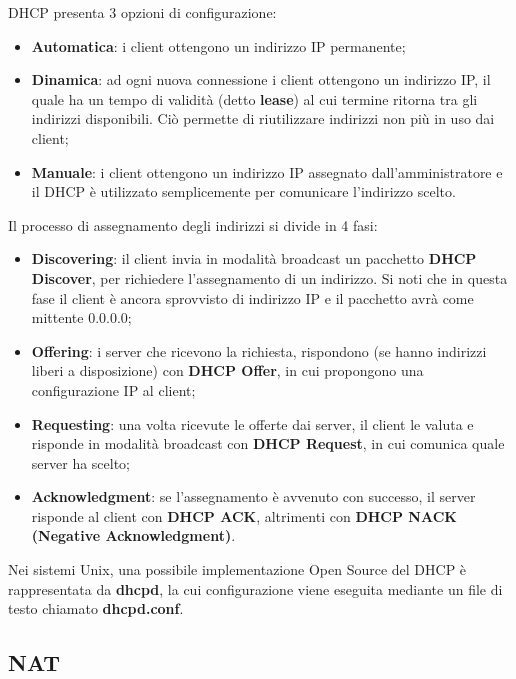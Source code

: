         DHCP presenta 3 opzioni di configurazione:

        \begin{itemize}
            \item \textbf{Automatica}: i client ottengono un indirizzo IP permanente;
            \item \textbf{Dinamica}: ad ogni nuova connessione i client ottengono un indirizzo IP, il quale ha un
            tempo di validità (detto \textbf{lease}) al cui termine ritorna tra gli indirizzi disponibili. Ciò
            permette di riutilizzare indirizzi non più in uso dai client;
            \item \textbf{Manuale}: i client ottengono un indirizzo IP assegnato dall’amministratore e il DHCP è
            utilizzato semplicemente per comunicare l’indirizzo scelto.
        \end{itemize}

        Il processo di assegnamento degli indirizzi si divide in 4 fasi:

        \begin{itemize}
            \item \textbf{Discovering}: il client invia in modalità broadcast un pacchetto \textbf{DHCP Discover}, per
            richiedere l’assegnamento di un indirizzo. Si noti che in questa fase il client è ancora
            sprovvisto di indirizzo IP e il pacchetto avrà come mittente 0.0.0.0;
            \item \textbf{Offering}: i server che ricevono la richiesta, rispondono (se hanno indirizzi liberi a
            disposizione) con \textbf{DHCP Offer}, in cui propongono una configurazione IP al client;
            \item \textbf{Requesting}: una volta ricevute le offerte dai server, il client le valuta e risponde in
            modalità broadcast con \textbf{DHCP Request}, in cui comunica quale server ha scelto;
            \item \textbf{Acknowledgment}: se l’assegnamento è avvenuto con successo, il server risponde al
            client con \textbf{DHCP ACK}, altrimenti con \textbf{DHCP NACK (Negative Acknowledgment)}.
        \end{itemize}

        Nei sistemi Unix, una possibile implementazione Open Source del DHCP è rappresentata da
        \textbf{dhcpd}, la cui configurazione viene eseguita mediante un file di testo chiamato \textbf{dhcpd.conf}.

    \subsection{NAT}
        
